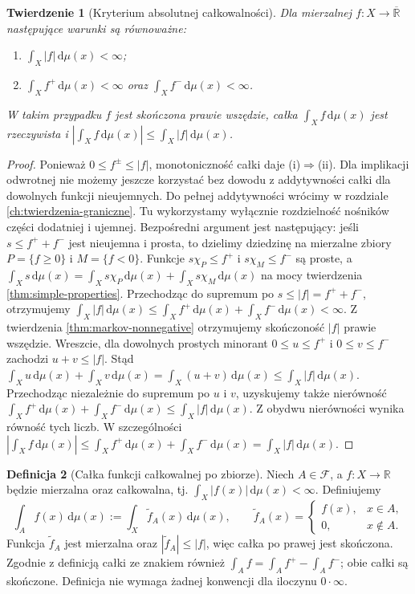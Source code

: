 \documentclass[11pt,a4paper,oneside]{book}
\numberwithin{equation}{chapter}
\theoremstyle{plain}
\newtheorem{twierdzenie}{Twierdzenie}[chapter]
\theoremstyle{definition}
\newtheorem{definicja}[twierdzenie]{Definicja}
\theoremstyle{remark}
\begin{document}
\begin{twierdzenie}[Kryterium absolutnej całkowalności]
\label{thm:integrability-criterion}
Dla mierzalnej $f:X\to\overline{\mathbb R}$ następujące
warunki są równoważne:
\begin{enumerate}[label=\textup{(\roman*)}]
\item $\int_X|f|\,\mathrm d\mu(x)<\infty$;
\item $\int_Xf^+\,\mathrm d\mu(x)<\infty$ oraz
$\int_Xf^-\,\mathrm d\mu(x)<\infty$.
\end{enumerate}
W takim przypadku $f$ jest skończona prawie wszędzie,
całka $\int_Xf\,\mathrm d\mu(x)$ jest rzeczywista i
$|\int_Xf\,\mathrm d\mu(x)|\le\int_X|f|\,\mathrm d\mu(x)$.
\end{twierdzenie}
\begin{proof}
Ponieważ $0\le f^\pm\le|f|$, monotoniczność całki
daje (i)$\Rightarrow$(ii). Dla implikacji odwrotnej
nie możemy jeszcze korzystać bez dowodu z addytywności
całki dla dowolnych funkcji nieujemnych. Do pełnej addytywności wrócimy w rozdziale
\ref{ch:twierdzenia-graniczne}. Tu wykorzystamy
wyłącznie rozdzielność nośników części dodatniej i ujemnej.
Bezpośredni argument jest następujący: jeśli
$s\le f^++f^-$ jest nieujemna i prosta, to
dzielimy dziedzinę na mierzalne zbiory
$P=\{f\ge0\}$ i $M=\{f<0\}$. Funkcje
$s\chi_P\le f^+$ i $s\chi_M\le f^-$
są proste, a
$\int_Xs\,\mathrm d\mu(x)=
\int_Xs\chi_P\,\mathrm d\mu(x)+
\int_Xs\chi_M\,\mathrm d\mu(x)$
na mocy twierdzenia \ref{thm:simple-properties}.
Przechodząc do supremum po $s\le|f|=f^++f^-$,
otrzymujemy
$\int_X|f|\,\mathrm d\mu(x)\le
\int_Xf^+\,\mathrm d\mu(x)+
\int_Xf^-\,\mathrm d\mu(x)<\infty$.
Z twierdzenia \ref{thm:markov-nonnegative} otrzymujemy
skończoność $|f|$ prawie wszędzie. Wreszcie, dla dowolnych prostych minorant
$0\le u\le f^+$ i $0\le v\le f^-$ zachodzi
$u+v\le|f|$. Stąd
$\int_Xu\,\mathrm d\mu(x)+\int_Xv\,\mathrm d\mu(x)
=\int_X(u+v)\,\mathrm d\mu(x)
\le\int_X|f|\,\mathrm d\mu(x)$.
Przechodząc niezależnie do supremum po $u$ i $v$,
uzyskujemy także nierówność
$\int_Xf^+\,\mathrm d\mu(x)+\int_Xf^-\,\mathrm d\mu(x)
\le\int_X|f|\,\mathrm d\mu(x)$.
Z obydwu nierówności wynika równość tych liczb.
W szczególności $|\int_Xf\,\mathrm d\mu(x)|
\le\int_Xf^+\,\mathrm d\mu(x)+
\int_Xf^-\,\mathrm d\mu(x)=\int_X|f|\,\mathrm d\mu(x)$.
\end{proof}

\begin{definicja}[Całka funkcji całkowalnej po zbiorze]
\label{def:signed-integral-over-set-7}
Niech $A\in\mathcal F$, a $f:X\to\mathbb R$ będzie
mierzalna oraz całkowalna, tj.
$\int_X|f(x)|\,\mathrm d\mu(x)<\infty$.
Definiujemy
\[
\int_A f(x)\,\mathrm d\mu(x)
:=\int_X\widetilde f_A(x)\,\mathrm d\mu(x),
\qquad
\widetilde f_A(x)=
\begin{cases}f(x),&x\in A,\\0,&x\notin A.\end{cases}
\]
Funkcja $\widetilde f_A$ jest mierzalna oraz
$|\widetilde f_A|\le|f|$, więc całka po prawej
jest skończona. Zgodnie z definicją całki ze znakiem
również
$\int_A f=\int_A f^+-\int_A f^-$;
obie całki są skończone. Definicja nie wymaga
żadnej konwencji dla iloczynu $0\cdot\infty$.
\end{definicja}
\end{document}

